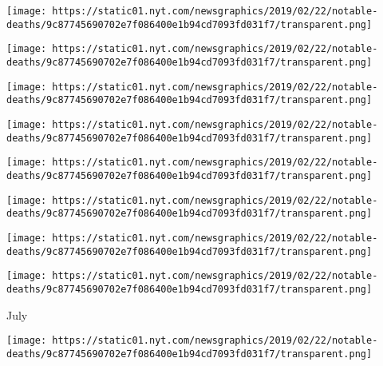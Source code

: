 \href{https://www.nytimes.com/2019/08/06/books/toni-morrison-dead.html}{}

\texttt{[image: https://static01.nyt.com/newsgraphics/2019/02/22/notable-deaths/9c87745690702e7f086400e1b94cd7093fd031f7/transparent.png]}

\href{https://www.nytimes.com/2019/08/06/science/j-robert-schrieffer-dead.html}{}

\texttt{[image: https://static01.nyt.com/newsgraphics/2019/02/22/notable-deaths/9c87745690702e7f086400e1b94cd7093fd031f7/transparent.png]}

\href{https://www.nytimes.com/2019/08/05/sports/football/cliff-branch-raiders-dead.html}{}

\texttt{[image: https://static01.nyt.com/newsgraphics/2019/02/22/notable-deaths/9c87745690702e7f086400e1b94cd7093fd031f7/transparent.png]}

\href{https://www.nytimes.com/2019/08/03/movies/d-a-pennebaker-dead.html}{}

\texttt{[image: https://static01.nyt.com/newsgraphics/2019/02/22/notable-deaths/9c87745690702e7f086400e1b94cd7093fd031f7/transparent.png]}

\href{https://www.nytimes.com/2019/08/02/obituaries/carlos-cruz-diez-dead.html}{}

\texttt{[image: https://static01.nyt.com/newsgraphics/2019/02/22/notable-deaths/9c87745690702e7f086400e1b94cd7093fd031f7/transparent.png]}

\href{https://www.nytimes.com/2019/08/01/education/vivian-paley-dead.html}{}

\texttt{[image: https://static01.nyt.com/newsgraphics/2019/02/22/notable-deaths/9c87745690702e7f086400e1b94cd7093fd031f7/transparent.png]}

\href{https://www.nytimes.com/2019/08/01/arts/dorothy-toy-dead.html}{}

\texttt{[image: https://static01.nyt.com/newsgraphics/2019/02/22/notable-deaths/9c87745690702e7f086400e1b94cd7093fd031f7/transparent.png]}

\href{https://www.nytimes.com/2019/08/01/sports/mario-gonzalez-dead.html}{}

\texttt{[image: https://static01.nyt.com/newsgraphics/2019/02/22/notable-deaths/9c87745690702e7f086400e1b94cd7093fd031f7/transparent.png]}

July

\href{https://www.nytimes.com/2019/07/31/theater/hal-prince-dead.html}{}

\texttt{[image: https://static01.nyt.com/newsgraphics/2019/02/22/notable-deaths/9c87745690702e7f086400e1b94cd7093fd031f7/transparent.png]}

